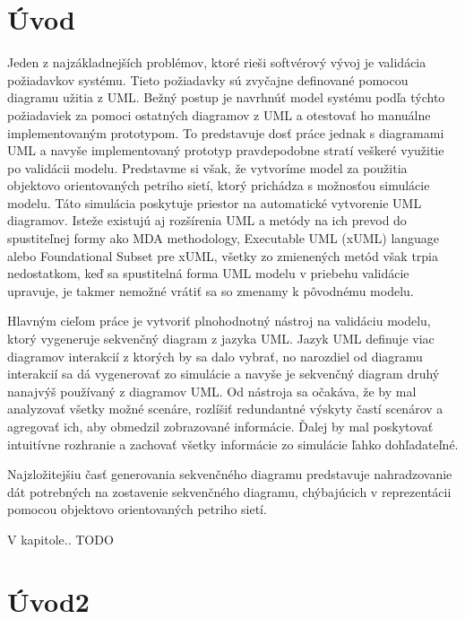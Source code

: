 \theoremstyle{definition}
\newtheorem{defn}{Definícia}[section]
\newtheorem{note}{Poznámka}[section]
\newtheorem{exmpl}{Príklad}[section]

\chapter{Úvod}


Jeden z najzákladnejších problémov, ktoré rieši softvérový vývoj je validácia požiadavkov systému. Tieto požiadavky sú zvyčajne definované pomocou diagramu užitia z UML. 
Bežný postup je navrhnúť model systému podľa týchto požiadaviek za pomoci ostatných diagramov z UML a otestovať ho manuálne implementovaným prototypom. To predstavuje dosť práce jednak s diagramami UML a navyše implementovaný prototyp pravdepodobne stratí veškeré využitie po validácii modelu. Predstavme si však, že vytvoríme model za použitia objektovo orientovaných petriho sietí, ktorý prichádza s možnosťou simulácie modelu. Táto simulácia poskytuje priestor na automatické vytvorenie UML diagramov. Isteže existujú aj rozšírenia UML a metódy na ich prevod do spustiteľnej formy ako MDA methodology, Executable UML (xUML) language alebo Foundational Subset pre xUML, všetky zo zmienených metód však trpia nedostatkom, keď sa spustitelná forma UML modelu v priebehu validácie upravuje, je takmer nemožné vrátiť sa so zmenamy k pôvodnému modelu. 

Hlavným cieľom práce je vytvoriť plnohodnotný nástroj na validáciu modelu, ktorý vygeneruje sekvenčný diagram z jazyka UML. Jazyk UML definuje viac diagramov interakcií z ktorých by sa dalo vybrať, no narozdiel od diagramu interakcií sa dá vygenerovať zo simulácie a navyše je sekvenčný diagram druhý nanajvýš používaný z diagramov UML. Od nástroja sa očakáva, že by mal analyzovať všetky možné scenáre, rozlíšiť redundantné výskyty častí scenárov a agregovať ich, aby obmedzil zobrazované informácie. Ďalej by mal poskytovať intuitívne rozhranie a zachovať všetky informácie zo simulácie ľahko dohľadateľné.

Najzložitejšiu časť generovania sekvenčného diagramu predstavuje nahradzovanie dát potrebných na zostavenie sekvenčného diagramu, chýbajúcich v reprezentácii pomocou objektovo orientovaných petriho sietí.

V kapitole.. TODO

\chapter{Úvod2}

